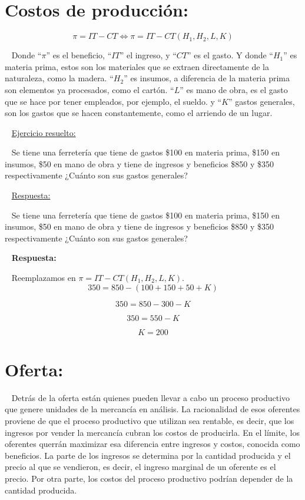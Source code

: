 \documentclass[
  letterpaper,
  DIV=11,
  numbers=noendperiod]{scrreport}
\begin{document}
\hypertarget{costos-de-producciuxf3n}{%
\section{Costos de producción:}\label{costos-de-producciuxf3n}}

\[
\pi = IT-CT \Leftrightarrow \pi = IT-CT(H_1,H_2,L,K)
\]

~ Donde ``\(\pi\)'' es el beneficio, ``\(IT\)'' el ingreso, y ``\(CT\)''
es el gasto. Y donde ``\(H_1\)'' es materia prima, estos son los
materiales que se extraen directamente de la naturaleza, como la madera.
``\(H_2\)'' es insumos, a diferencia de la materia prima son elementos
ya procesados, como el cartón. ``\(L\)'' es mano de obra, es el gasto
que se hace por tener empleados, por ejemplo, el sueldo. y ``\(K\)''
gastos generales, son los gastos que se hacen constantemente, como el
arriendo de un lugar.

~ \ul{Ejercicio resuelto:}

~ Se tiene una ferretería que tiene de gastos \$100 en materia prima,
\$150 en insumos, \$50 en mano de obra y tiene de ingresos y beneficios
\$850 y \$350 respectivamente ¿Cuánto son sus gastos generales?

~ \ul{Respuesta:}

~ Se tiene una ferretería que tiene de gastos \$100 en materia prima,
\$150 en insumos, \$50 en mano de obra y tiene de ingresos y beneficios
\$850 y \$350 respectivamente ¿Cuánto son sus gastos generales?

~ \textbf{Respuesta:}

~ Reemplazamos en \(\pi = IT-CT(H_1,H_2,L,K)\). \[
350 = 850-(100+150+50+K)
\]

\[
350 = 850-300-K
\]

\[
350 = 550-K
\]

\[
K = 200
\]

\hypertarget{oferta}{%
\section{Oferta:}\label{oferta}}

~ Detrás de la oferta están quienes pueden llevar a cabo un proceso
productivo que genere unidades de la mercancía en análisis. La
racionalidad de esos oferentes proviene de que el proceso productivo que
utilizan sea rentable, es decir, que los ingresos por vender la
mercancía cubran los costos de producirla. En el límite, los oferentes
querrán maximizar esa diferencia entre ingresos y costos, conocida como
beneficios. La parte de los ingresos se determina por la cantidad
producida y el precio al que se vendieron, es decir, el ingreso marginal
de un oferente es el precio. Por otra parte, los costos del proceso
productivo podrían depender de la cantidad producida.
\end{document}
